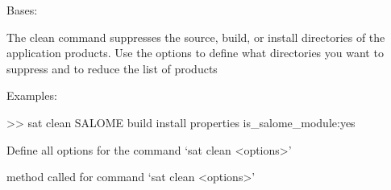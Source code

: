 \documentclass[a4paper,10pt,english]{sphinxmanual}
\begin{document}
\begin{fulllineitems}
\label{\detokenize{apidoc_commands/commands:commands.clean.Command}}
Bases: 

The clean command suppresses the source, build, or install directories 
of the application products.
Use the options to define what directories you want to suppress and 
to reduce the list of products

\begin{DUlineblock}{0em}
\item[] Examples:
\item[] \textgreater{}\textgreater{} sat clean SALOME \textendash{}build \textendash{}install \textendash{}properties is\_salome\_module:yes
\end{DUlineblock}

\begin{fulllineitems}
\label{\detokenize{apidoc_commands/commands:commands.clean.Command.getParser}}
Define all options for the command ‘sat clean \textless{}options\textgreater{}’

\end{fulllineitems}


\begin{fulllineitems}
\label{\detokenize{apidoc_commands/commands:commands.clean.Command.name}}
\end{fulllineitems}


\begin{fulllineitems}
\label{\detokenize{apidoc_commands/commands:commands.clean.Command.run}}
method called for command ‘sat clean \textless{}options\textgreater{}’

\end{fulllineitems}


\end{fulllineitems}
\end{document}

